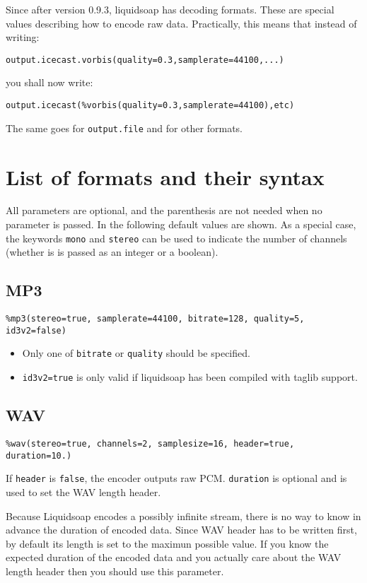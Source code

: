 Since after version 0.9.3, liquidsoap has decoding formats. These are
special values describing how to encode raw data.
Practically, this means that instead of writing:

\begin{verbatim}
output.icecast.vorbis(quality=0.3,samplerate=44100,...)
\end{verbatim}
you shall now write:

\begin{verbatim}
output.icecast(%vorbis(quality=0.3,samplerate=44100),etc)
\end{verbatim}
The same goes for \verb+output.file+ and for other formats.

\section{List of formats and their syntax}
All parameters are optional, and the parenthesis are not needed
when no parameter is passed. In the following default values
are shown.
As a special case, the keywords \verb+mono+ and \verb+stereo+ can be used to indicate
the number of channels (whether is is passed as an integer or a boolean).

\subsection{MP3}
\begin{verbatim}
%mp3(stereo=true, samplerate=44100, bitrate=128, quality=5, id3v2=false)
\end{verbatim}
\begin{itemize}
\item Only one of \verb+bitrate+ or \verb+quality+ should be specified.
\item \verb+id3v2=true+ is only valid if liquidsoap has been compiled with taglib support.

\end{itemize}
\subsection{WAV}
\begin{verbatim}
%wav(stereo=true, channels=2, samplesize=16, header=true, duration=10.)
\end{verbatim}
If \verb+header+ is \verb+false+, the encoder outputs raw PCM. \verb+duration+ is optional
and is used to set the WAV length header.

Because Liquidsoap encodes a possibly infinite stream, there
is no way to know in advance the duration of encoded data. Since WAV header
has to be written first, by default its length is set to the maximun possible 
value. If you know the expected duration of the encoded data and you actually 
care about the WAV length header then you should use this parameter.


